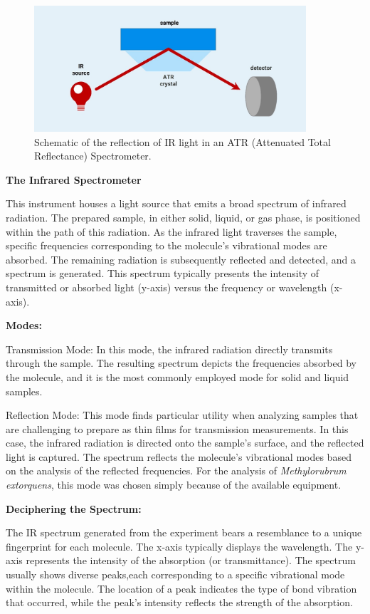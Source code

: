 \begin{figure}[H]
    \centering
    \includegraphics[width=0.9\textwidth]{./media/images/ir_spectrometer}
    \caption{Schematic of the reflection of IR light in an ATR (Attenuated Total Reflectance) Spectrometer.}
    \label{fig:ir_spectrometer}
\end{figure}

\textbf{The Infrared Spectrometer}

This instrument houses a light source that emits a broad spectrum of infrared radiation.
The prepared sample, in either solid, liquid, or gas phase, is positioned within the path of this radiation.
As the infrared light traverses the sample, specific frequencies corresponding to the molecule's vibrational modes are absorbed.
The remaining radiation is subsequently reflected and detected, and a spectrum is generated.
This spectrum typically presents the intensity of transmitted or absorbed light (y-axis) versus the frequency or wavelength (x-axis).

\textbf{Modes:}

Transmission Mode: In this mode, the infrared radiation directly transmits through the sample.
The resulting spectrum depicts the frequencies absorbed by the molecule, and it is the most commonly employed mode for solid and liquid samples.

Reflection Mode: This mode finds particular utility when analyzing samples that are challenging to prepare as thin films for transmission measurements.
In this case, the infrared radiation is directed onto the sample's surface, and the reflected light is captured.
The spectrum reflects the molecule's vibrational modes based on the analysis of the reflected frequencies.
For the analysis of \emph{Methylorubrum extorquens}, this mode was chosen simply because of the available equipment.

\textbf{Deciphering the Spectrum:}

The IR spectrum generated from the experiment bears a resemblance to a unique fingerprint for each molecule.
The x-axis typically displays the wavelength.
The y-axis represents the intensity of the absorption (or transmittance).
The spectrum usually shows diverse peaks,each corresponding to a specific vibrational mode within the molecule.
The location of a peak indicates the type of bond vibration that occurred, while the peak's intensity reflects the strength of the absorption.

